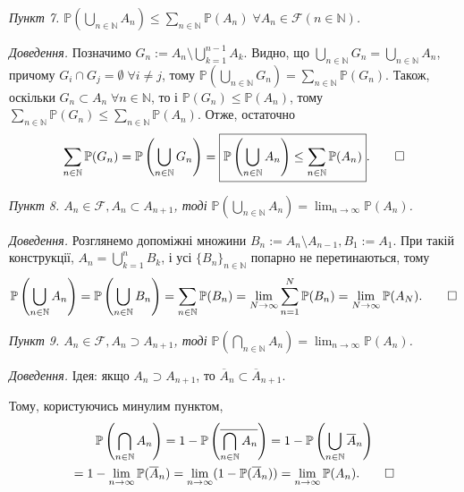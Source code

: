 \documentclass[oneside,solution]{karazin-prob-theory-assign}
\begin{document}
\vspace{10px}
\textit{Пункт 7. $\mathbb{P}\left(\bigcup_{n\in\mathbb{N}}A_n\right) \leq \sum_{n \in \mathbb{N}}\mathbb{P}(A_n) \; \forall A_n \in \mathcal{F}(n \in \mathbb{N})$.}

\textit{Доведення.} Позначимо $G_n := A_n \setminus \bigcup_{k=1}^{n-1}A_k$. Видно, що $\bigcup_{n \in \mathbb{N}}G_n = \bigcup_{n \in \mathbb{N}}A_n$, причому $G_i \cap G_j = \emptyset \; \forall i \neq j$, тому $\mathbb{P}\left(\bigcup_{n \in \mathbb{N}}G_n\right) = \sum_{n \in \mathbb{N}}\mathbb{P}(G_n)$. Також, оскільки $G_n \subset A_n \; \forall n \in \mathbb{N}$, то і $\mathbb{P}(G_n) \leq \mathbb{P}(A_n)$, тому $\sum_{n \in \mathbb{N}}\mathbb{P}(G_n) \leq \sum_{n \in \mathbb{N}}\mathbb{P}(A_n)$. Отже, остаточно 
\begin{equation}
    \sum_{n \in \mathbb{N}}\mathbb{P}(G_n) = \mathbb{P}\left(\bigcup_{n \in \mathbb{N}}G_n\right) = \boxed{\mathbb{P}\left(\bigcup_{n \in \mathbb{N}}A_n\right) \leq \sum_{n \in \mathbb{N}}\mathbb{P}(A_n)}.\qed
\end{equation}

\vspace{10px}
\textit{Пункт 8. $A_n \in \mathcal{F},A_n \subset A_{n+1}$, тоді $\mathbb{P}\left(\bigcup_{n \in \mathbb{N}}A_n\right) = \lim_{n \to \infty}\mathbb{P}(A_n)$.}

\textit{Доведення.} Розглянемо допоміжні множини $B_n:=A_n \setminus A_{n-1},B_1:=A_1$. При такій конструкції, $A_n = \bigcup_{k=1}^n B_k$, і усі $\{B_n\}_{n \in \mathbb{N}}$ попарно не перетинаються, тому
\begin{equation}
    \mathbb{P}\left(\bigcup_{n \in \mathbb{N}}A_n\right) = \mathbb{P}\left(\bigcup_{n \in \mathbb{N}}B_n\right) = \sum_{n \in \mathbb{N}}\mathbb{P}(B_n) = \lim_{N \to \infty}\sum_{n=1}^N \mathbb{P}(B_n) = \lim_{N \to \infty} \mathbb{P}(A_N). \qed
\end{equation}

\vspace{10px}
\textit{Пункт 9. $A_n \in \mathcal{F},A_{n} \supset A_{n+1}$, тоді $\mathbb{P}\left(\bigcap_{n \in \mathbb{N}}A_n\right) = \lim_{n \to \infty}\mathbb{P}(A_n)$.}

\textit{Доведення.} Ідея: якщо $A_n \supset A_{n+1}$, то $\overline{A}_n \subset \overline{A}_{n+1}$. 

Тому, користуючись минулим пунктом,
\begin{gather}
    \mathbb{P}\left(\bigcap_{n \in \mathbb{N}}A_n\right) = 1 - \mathbb{P}\left(\overline{\bigcap_{n \in \mathbb{N}}A_n}\right) = 1 - \mathbb{P}\left(\bigcup_{n \in \mathbb{N}}\overline{A}_n\right)\nonumber\\
    = 1 - \lim_{n \to \infty}\mathbb{P}(\overline{A}_n) = \lim_{n \to \infty}(1-\mathbb{P}(\overline{A}_n)) = \lim_{n \to \infty} \mathbb{P}(A_n).\qed
\end{gather}
\end{document}
